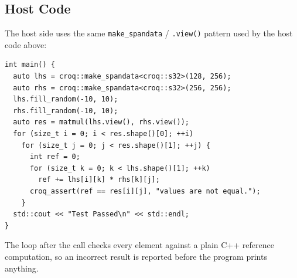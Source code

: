 \subsection*{Host Code}

The host side uses the same \texttt{make\_spandata} / \texttt{.view()} pattern used by the host code above:

\begin{lstlisting}[language=croqtile,caption={Host Code}]
int main() {
  auto lhs = croq::make_spandata<croq::s32>(128, 256);
  auto rhs = croq::make_spandata<croq::s32>(256, 256);
  lhs.fill_random(-10, 10);
  rhs.fill_random(-10, 10);
  auto res = matmul(lhs.view(), rhs.view());
  for (size_t i = 0; i < res.shape()[0]; ++i)
    for (size_t j = 0; j < res.shape()[1]; ++j) {
      int ref = 0;
      for (size_t k = 0; k < lhs.shape()[1]; ++k)
        ref += lhs[i][k] * rhs[k][j];
      croq_assert(ref == res[i][j], "values are not equal.");
    }
  std::cout << "Test Passed\n" << std::endl;
}
\end{lstlisting}

The loop after the call checks every element against a plain C++ reference computation, so an incorrect result is reported before the program prints anything.
